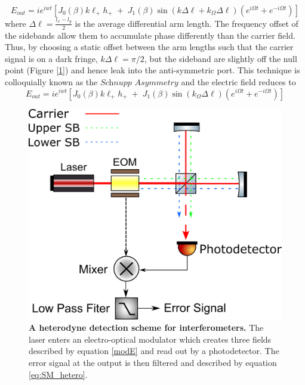 		\begin{equation}
		E_{out} = i e^{iwt} [ J_0(\beta) 	k \ell_{+}  h_{+}  \; + \; J_1(\beta) \sin( k \Delta \ell + k_{\Omega} \Delta \ell) (e^{i\Omega t}  + e^{-i\Omega t}) ]
		\end{equation}
		where $\Delta \ell = \frac{l_x-l_y}{2}$ is the average differential arm length. The frequency offset of the sidebands allow them to accumulate phase differently than the carrier field. Thus, by choosing a static offset between the arm lengths such that the carrier signal is on a dark fringe, $k \Delta \ell = \pi/2$, but the sideband are slightly off the null point (Figure [\ref{fig:MichelsonHetero}]) and hence leak into the anti-symmetric port.  This technique is colloquially known as the $\textit{Schnupp}$ $\textit{Asymmetry}$ and the electric field reduces to
		\begin{equation}
		E_{out} = i e^{iwt} [ J_0(\beta) 	k \ell_{+}  h_{+}  \; + \; J_1(\beta) \sin(k_{\Omega} \Delta \ell) ( e^{i\Omega t} + e^{-i\Omega t}) ]
		\end{equation}
		
		\begin{figure}[h]
			\centering
			\includegraphics[width=.6 \textwidth]{../Figures/SimpleMichelsonHetero.png}
			\caption[A heterodyne detection scheme for interferometers.]  
			{\textbf{A heterodyne detection scheme for interferometers.} The laser enters an electro-optical modulator which creates three fields described by equation \ref{modE} and read out by a photodetector.  The error signal at the output is then filtered and described by equation \ref{eq:SM_hetero}.}
			\label{fig:MichelsonHetero}
		\end{figure}
		

